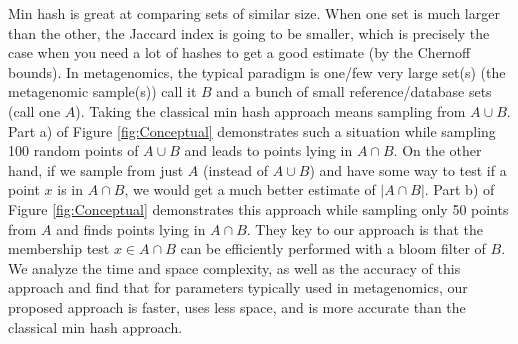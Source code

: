 \documentclass[11pt]{amsart}
\theoremstyle{remark}
\numberwithin{equation}{section}
\begin{document}
Min hash is great at comparing sets of similar size. When one set is much larger than the other, the Jaccard index is going to be smaller, which is precisely the case when you need a lot of hashes to get a good estimate (by the Chernoff bounds). In metagenomics, the typical paradigm is one/few very large set(s) (the metagenomic sample(s)) call it $B$ and a bunch of small reference/database sets (call one $A$). Taking the classical min hash approach means sampling from $A\cup B$. Part a) of Figure \ref{fig:Conceptual} demonstrates such a situation while sampling 100 random points of $A\cup B$ and leads to points lying in $A\cap B$. On the other hand, if we sample from just $A$ (instead of $A\cup B$) and have some way to test if a point $x$ is in $A\cap B$, we would get a much better estimate of $|A\cap B|$. Part b) of Figure \ref{fig:Conceptual} demonstrates this approach while sampling only 50 points from $A$ and finds points lying in $A\cap B$. They key to our approach is that the membership test $x\in A\cap B$ can be efficiently performed with a bloom filter of $B$. We analyze the time and space complexity, as well as the accuracy of this approach and find that for parameters typically used in metagenomics, our proposed approach is faster, uses less space, and is more accurate than the classical min hash approach.
\end{document}
